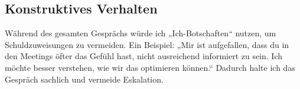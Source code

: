 \subsection{Konstruktives Verhalten}
Während des gesamten Gesprächs würde ich „Ich-Botschaften“ nutzen, um Schuldzuweisungen zu vermeiden. Ein Beispiel: „Mir ist aufgefallen, dass du in den Meetings öfter das Gefühl hast, nicht ausreichend informiert zu sein. Ich möchte besser verstehen, wie wir das optimieren können.“ Dadurch halte ich das Gespräch sachlich und vermeide Eskalation.

